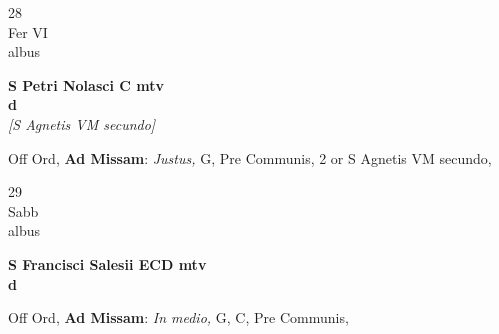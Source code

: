 \documentclass[10pt, openany]{book}
\begin{document}
        \begin{center}
            \begin{minipage}{3.5in}
                \vspace{2em}
                \begin{minipage}{0.5in}
                    {\Huge 28} \\
                    {\normalsize Fer VI} \\
                    {\normalsize albus}
                \end{minipage}
                \begin{minipage}{3.0in}
                    \textbf{ \large S Petri Nolasci C mtv \\
                    \textnormal{\normalsize d}} \\ \textit{[S Agnetis VM secundo]} \\ 
                \end{minipage}
                \begin{justify}Off Ord, \textbf{Ad Missam}: \textit{Justus,} G, Pre Communis, 2 or S Agnetis VM secundo,   
                \end{justify}
            \end{minipage}
        \end{center}
    
        \begin{center}
            \begin{minipage}{3.5in}
                \vspace{2em}
                \begin{minipage}{0.5in}
                    {\Huge 29} \\
                    {\normalsize Sabb} \\
                    {\normalsize albus}
                \end{minipage}
                \begin{minipage}{3.0in}
                    \textbf{ \large S Francisci Salesii ECD mtv \\
                    \textnormal{\normalsize d}} \\ 
                \end{minipage}
                \begin{justify}Off Ord, \textbf{Ad Missam}: \textit{In medio,} G, C, Pre Communis,   
                \end{justify}
            \end{minipage}
        \end{center}
    
\end{document}
